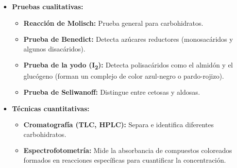 \begin{itemize}
    \item \textbf{Pruebas cualitativas:}
    \begin{itemize}
        \item \textbf{Reacción de Molisch:} Prueba general para carbohidratos.
        \item \textbf{Prueba de Benedict:} Detecta azúcares reductores (monosacáridos y algunos disacáridos).
        \item \textbf{Prueba de la yodo (I\textsubscript{2}):} Detecta polisacáridos como el almidón y el glucógeno (forman un complejo de color azul-negro o pardo-rojizo).
        \item \textbf{Prueba de Seliwanoff:} Distingue entre cetosas y aldosas.
    \end{itemize}
    \item \textbf{Técnicas cuantitativas:}
    \begin{itemize}
        \item \textbf{Cromatografía (TLC, HPLC):} Separa e identifica diferentes carbohidratos.
        \item \textbf{Espectrofotometría:} Mide la absorbancia de compuestos coloreados formados en reacciones específicas para cuantificar la concentración.
    \end{itemize}
\end{itemize}

